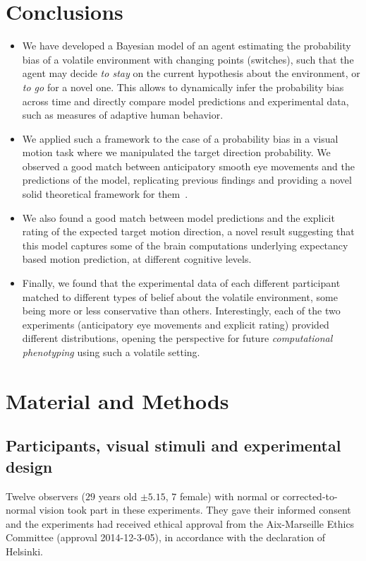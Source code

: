 \documentclass[10pt,letterpaper]{article}
\newcommand{\citep}[1]{\cite{#1}}
\begin{document}
\section*{Conclusions}
\begin{itemize}\setlength{\itemsep}{0ex}
\item We have developed a Bayesian model of an agent estimating the probability bias of a volatile environment with changing points (switches), such that the agent may decide \textit{to stay} on the current hypothesis about the environment, or \textit{to go} for a novel one. This allows to dynamically infer the probability bias across time and directly compare model predictions and experimental data, such as measures of adaptive human behavior.
\item We applied such a framework to the case of a probability bias in a visual motion task where we manipulated the target direction probability. We observed a good match between anticipatory smooth eye movements and the predictions of the model, replicating previous findings and providing a novel solid theoretical framework for them~\citep{Montagnini2010, SantosKowler2017, Damasse18}.
\item We also found a good match between model predictions and the explicit rating of the expected target motion direction, a novel result suggesting that this model captures some of the brain computations underlying expectancy based motion prediction, at different cognitive levels.
\item Finally, we found that the experimental data of each different participant matched to different types of belief about the volatile environment, some being more or less conservative than others. Interestingly, each of the two experiments (anticipatory eye movements and explicit rating) provided different distributions, opening the perspective for future \emph{computational phenotyping} using such a volatile setting.
\end{itemize}
\section*{Material and Methods}
\label{sec:methods}
\subsection*{Participants, visual stimuli and experimental design}
Twelve observers ($29$ years old $\pm 5.15$, $7$ female) with normal or corrected-to-normal vision took part in these experiments. They gave their informed consent and the experiments had received ethical approval from the Aix-Marseille Ethics Committee (approval 2014-12-3-05), in accordance with the declaration of Helsinki.
\end{document}
